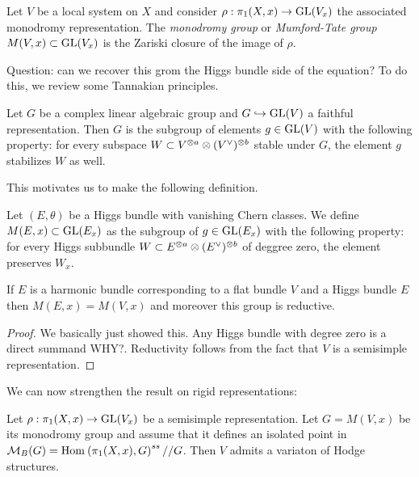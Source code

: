 \documentclass[12pt]{article}
\begin{document}
\begin{defn}
Let $V$ be a local system on $X$ and consider $\rho : \pi_1(X, x) \to \mathrm{GL}(V_x)$ the associated monodromy representation. The \textit{monodromy group} or \textit{Mumford-Tate group} $M(V,x) \subset \mathrm{GL}(V_x)$ is the Zariski closure of the image of $\rho$.
\end{defn}

Question: can we recover this grom the Higgs bundle side of the equation? To do this, we review some Tannakian principles.

\begin{prop}
Let $G$ be a complex linear algebraic group and $G \hookrightarrow \mathrm{GL}(V)$ a faithful representation. Then $G$ is the subgroup of elements $g \in \mathrm{GL}(V)$ with the following property: for every subspace $W \subset V^{\otimes a} \otimes (V^\vee)^{\otimes b}$ stable under $G$, the element $g$ stabilizes $W$ as well. 
\end{prop}

This motivates us to make the following definition.

\begin{defn}
Let $(E, \theta)$ be a Higgs bundle with vanishing Chern classes. We define $M(E, x) \subset \mathrm{GL}(E_x)$ as the subgroup of $g \in \mathrm{GL}(E_x)$ with the following property: for every Higgs subbundle $W \subset E^{\otimes a} \otimes (E^{\vee})^{\otimes b}$ of deggree zero, the element preserves $W_x$. 
\end{defn}

\begin{prop}
If $E$ is a harmonic bundle corresponding to a flat bundle $V$ and a Higgs bundle $E$ then $M(E, x) = M(V, x)$ and moreover this group is reductive.
\end{prop}

\begin{proof}
We basically just showed this. Any Higgs bundle with degree zero is a direct summand {\color{red} WHY?}. Reductivity follows from the fact that $V$ is a semisimple representation.
\end{proof}

We can now strengthen the result on rigid representations:

\begin{prop}
Let $\rho : \pi_1(X, x) \to \mathrm{GL}(V_x)$ be a semisimple representation. Let $G = M(V, x)$ be its monodromy group and assume that it defines an isolated point in $\mathcal{M}_B(G) = \mathrm{Hom}_{} \left( \pi_1(X, x), G \right)^{ss} // G$. Then $V$ admits a variaton of Hodge structures.
\end{prop}
\end{document}
